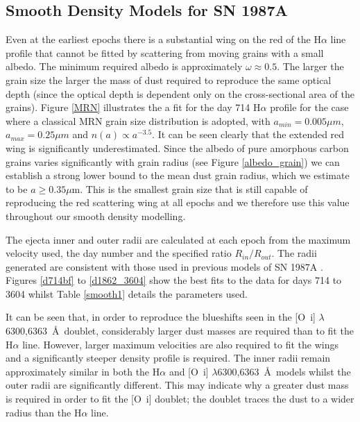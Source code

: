\subsection{Smooth Density Models for SN 1987A}
\label{smooth_models}

Even at the earliest epochs there is a substantial wing on the red of 
the H$\alpha$ line profile that cannot be fitted by scattering from moving grains with a small albedo.  The 
minimum required albedo is approximately $\omega \approx 0.5$.  The larger 
the grain size the larger the mass of dust required to reproduce the same 
optical depth (since the optical depth is dependent only on the 
cross-sectional area of the grains).  Figure \ref{MRN} illustrates the 
a fit for the day 714 H$\alpha$ profile for the case where a classical MRN grain size 
distribution is adopted, with $a_{min}=0.005 \mu m$, $a_{max}=0.25 \mu m$ 
and $n(a) \propto a^{-3.5}$.  It can be seen clearly that the extended red wing is 
significantly underestimated.  Since the albedo of pure 
amorphous carbon grains varies significantly with grain radius (see Figure \ref{albedo_grain}) we can establish a strong 
lower bound to the mean dust grain radius, which we estimate to be $a \ge 0.35\mu$m.  This is the smallest grain size that is still 
capable of reproducing the red scattering wing at all epochs and we 
therefore use this value throughout our smooth density modelling.

The ejecta inner and outer radii are calculated at each epoch from the maximum 
velocity used, the day number and the specified ratio $R_{in}/R_{out}$.  
The radii generated are consistent with those used in previous models of 
SN 1987A \citep{Ercolano2007, Wesson2015}.  Figures \ref{d714bf} to 
\ref{d1862_3604} show the best fits to the data for days 714 to 3604 whilst 
Table \ref{smooth1} details the parameters used.

It can be seen that, in order to reproduce the blueshifts seen in the 
[O~{\sc i}] $\lambda$6300,6363~\AA\ doublet, considerably larger dust masses 
are required than to fit the H$\alpha$ line.  However, larger maximum 
velocities are also required to fit the wings and a significantly steeper 
density profile is required.  The inner radii remain approximately similar 
in both the H$\alpha$ and [O~{\sc i}] $\lambda$6300,6363~\AA\ models whilst the 
outer radii are significantly different.  This may indicate why a greater 
dust mass is required in order to fit the [O~{\sc i}] doublet; the doublet 
traces the dust to a wider radius than the H$\alpha$ line.


